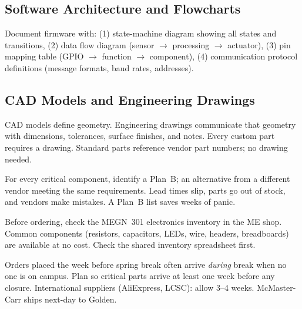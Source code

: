 \documentclass[11pt,letterpaper,twoside,openany]{book}
\begin{document}
\subsection{Software Architecture and Flowcharts}
Document firmware with: (1) state-machine diagram showing all states and transitions, (2) data flow diagram (sensor $\to$ processing $\to$ actuator), (3) pin mapping table (GPIO $\to$ function $\to$ component), (4) communication protocol definitions (message formats, baud rates, addresses).

\subsection{CAD Models and Engineering Drawings}
CAD models define geometry. Engineering drawings communicate that geometry with dimensions, tolerances, surface finishes, and notes. Every custom part requires a drawing. Standard parts reference vendor part numbers; no drawing needed.

\begin{tipbox}
For every critical component, identify a Plan~B; an alternative from a different vendor meeting the same requirements. Lead times slip, parts go out of stock, and vendors make mistakes. A Plan~B list saves weeks of panic.
\end{tipbox}

\begin{tipbox}
Before ordering, check the MEGN~301 electronics inventory in the ME shop. Common components (resistors, capacitors, LEDs, wire, headers, breadboards) are available at no cost. Check the shared inventory spreadsheet first.
\end{tipbox}

\begin{tipbox}
Orders placed the week before spring break often arrive \emph{during} break when no one is on campus. Plan so critical parts arrive at least one week before any closure. International suppliers (AliExpress, LCSC): allow 3--4 weeks. McMaster-Carr ships next-day to Golden.
\end{tipbox}
\end{document}
